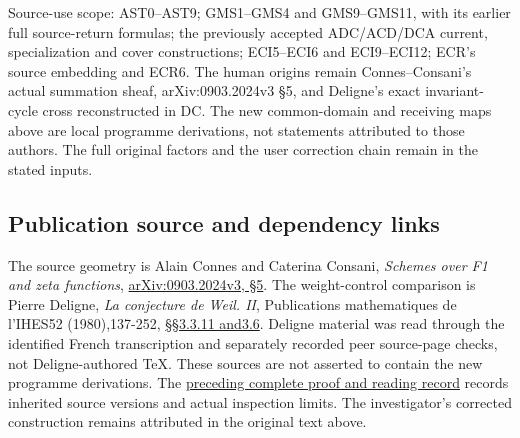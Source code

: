 Source-use scope: AST0--AST9; GMS1--GMS4 and GMS9--GMS11, with its
earlier full source-return formulas; the previously accepted ADC/ACD/DCA
current, specialization and cover constructions; ECI5--ECI6 and
ECI9--ECI12; ECR's source embedding and ECR6. The human origins remain
Connes--Consani's actual summation sheaf, arXiv:0903.2024v3 §5, and
Deligne's exact invariant-cycle cross reconstructed in DC. The new
common-domain and receiving maps above are local programme derivations,
not statements attributed to those authors. The full original factors
and the user correction chain remain in the stated inputs.

\subsection{Publication source and dependency
links}\label{publication-source-and-dependency-links}

The source geometry is Alain Connes and Caterina Consani, \emph{Schemes
over F1 and zeta functions},
\href{https://arxiv.org/abs/0903.2024v3}{arXiv:0903.2024v3, §5}. The
weight-control comparison is Pierre Deligne, \emph{La conjecture de
Weil. II}, Publications mathematiques de l'IHES52 (1980),137-252,
\href{https://www.numdam.org/item/PMIHES_1980__52__137_0/}{§§3.3.11
and3.6}. Deligne material was read through the identified French
transcription and separately recorded peer source-page checks, not
Deligne-authored TeX. These sources are not asserted to contain the new
programme derivations. The
\href{https://github.com/KokunoYumeto/zeta-function-research-reader/blob/36a82ecca98addb8a98b48204e349737856c7223/workbenches/splitzero-tandem/continuations/20260924-cohomology-weight-and-character-lifts/BUILD_AND_REVIEW.md}{preceding
complete proof and reading record} records inherited source versions and
actual inspection limits. The investigator's corrected construction
remains attributed in the original text above.
